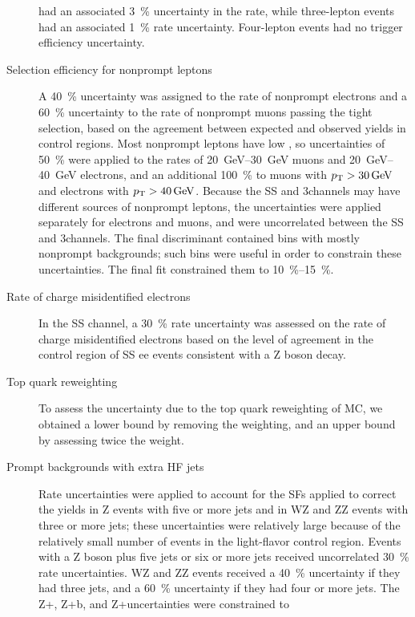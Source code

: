 \begin{description}
    had an associated \SI{3}{\percent} uncertainty in the rate, while
    three-lepton events had an associated \SI{1}{\percent} rate uncertainty.
    Four-lepton events had no trigger efficiency uncertainty.
  \item[Selection efficiency for nonprompt leptons] A \SI{40}{\percent}
    uncertainty was assigned to the rate of nonprompt electrons and a
    \SI{60}{\percent} uncertainty to the rate of nonprompt muons passing the
    tight selection, based on the agreement between expected and observed yields
    in control regions. Most nonprompt leptons have low \pT, so uncertainties of
    \SI{50}{\percent} were applied to the rates of \SIrange{20}{30}{\GeV} muons
    and \SIrange{20}{40}{\GeV} electrons, and an additional \SI{100}{\percent}
    to muons with $\pT > \SI{30}{\GeV}$ and electrons with $\pT >
    \SI{40}{\GeV}$. Because the SS and 3\lep channels may have different sources
    of nonprompt leptons, the uncertainties were applied separately for
    electrons and muons, and were uncorrelated between the SS and 3\lep channels. The
    final discriminant contained bins with mostly nonprompt backgrounds; such
    bins were useful in order to constrain these uncertainties. The final fit
    constrained them to \SIrange{10}{15}{\percent}.
  \item[Rate of charge misidentified electrons] In the SS channel, a
    \SI{30}{\percent} rate uncertainty was assessed on the rate of charge
    misidentified electrons based on the level of agreement in the control
    region of SS ee events consistent with a Z boson decay.
  \item[Top quark \pT reweighting] To assess the uncertainty due to the top
    quark \pT reweighting of \ttbar MC, we obtained a lower bound by removing the \pT
    weighting, and an upper bound by assessing twice the weight.
  \item[Prompt backgrounds with extra HF jets] Rate uncertainties were applied to
    account for the SFs applied to correct the yields in Z events with five or
    more jets and in WZ and ZZ events with three or more jets; these uncertainties
    were relatively large because of the relatively small number of events in the
    light-flavor control region. Events with a Z boson plus five jets or six or
    more jets received uncorrelated \SI{30}{\percent} rate uncertainties. WZ and
    ZZ events received a \SI{40}{\percent} uncertainty if they had three jets,
    and a \SI{60}{\percent} uncertainty if they had four or more jets. The
    Z+\ccbar, Z+b, and Z+\bbbar uncertainties were constrained to

\end{description}
